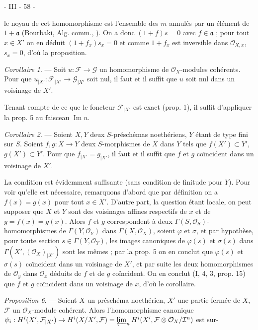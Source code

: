 \newpage


- III - 58 -

le noyau de cet homomorphisme est l'ensemble des $m$ annulés par un élément de $1+\mathfrak{a}$ (Bourbaki, Alg. comm., ). On a donc $(1+f)s=0$ avec $f \in \mathfrak{a}$ ; pour tout $x \in X'$ on en déduit $(1+f_x)s_x=0$ et comme $1+f_x$ est inversible dans $\mathcal{O}_{X,x}$, $s_x=0$, d'où la proposition.

\emph{Corollaire 1}. — Soit $u : \mathcal{F} \to \mathcal{G}$ un homomorphisme de $\mathcal{O}_X$-modules cohérents. Pour que $u_{|X'} : \mathcal{F}_{|X'} \to \mathcal{G}_{|X'}$ soit nul, il faut et il suffit que $u$ soit nul dans un voisinage de $X'$.

Tenant compte de ce que le foncteur $\mathcal{F}_{|X'}$ est exact (prop. 1), il suffit d'appliquer la prop. 5 au faisceau $\operatorname{Im} u$.

\emph{Corollaire 2}. — Soient $X, Y$ deux $S$-préschémas noethériens, $Y$ étant de type fini sur $S$. Soient $f, g : X \to Y$ deux $S$-morphismes de $X$ dans $Y$ tels que $f(X') \subset Y'$, $g(X') \subset Y'$. Pour que $f_{|X'} = g_{|X'}$, il faut et il suffit que $f$ et $g$ coïncident dans un voisinage de $X'$.

La condition est évidemment suffisante (sans condition de finitude pour $Y$). Pour voir qu'elle est nécessaire, remarquons d'abord que par définition on a $f(x)=g(x)$ pour tout $x \in X'$. D'autre part, la question étant locale, on peut supposer que $X$ et $Y$ sont des voisinages affines respectifs de $x$ et de $y=f(x)=g(x)$. Alors $f$ et $g$ correspondent à deux $\Gamma(S, \mathcal{O}_S)$-homomorphismes de $\Gamma(Y, \mathcal{O}_Y)$ dans $\Gamma(X, \mathcal{O}_X)$, soient $\varphi$ et $\sigma$, et par hypothèse, pour toute section $s \in \Gamma(Y, \mathcal{O}_Y)$, les images canoniques de $\varphi(s)$ et $\sigma(s)$ dans $\Gamma(X', (\mathcal{O}_X)_{|X'})$ sont les mêmes ; par la prop. 5 on en conclut que $\varphi(s)$ et $\sigma(s)$ coïncident dans un voisinage de $X'$, et par suite les deux homomorphismes de $\mathcal{O}_y$ dans $\mathcal{O}_x$ déduits de $f$ et de $g$ coïncident. On en conclut (I, 4, 3, prop. 15) que $f$ et $g$ coïncident dans un voisinage de $x$, d'où le corollaire.

\emph{Proposition 6}. — Soient $X$ un préschéma noethérien, $X'$ une partie fermée de $X$, $\mathcal{F}$ un $\mathcal{O}_X$-module cohérent. Alors l'homomorphisme canonique $\psi_i : H^i(X', \mathcal{F}_{|X'}) \to H^i(X/X', \mathcal{F}) = \varprojlim_n H^i(X', \mathcal{F} \otimes \mathcal{O}_X/\mathcal{I}^n)$ est sur-

